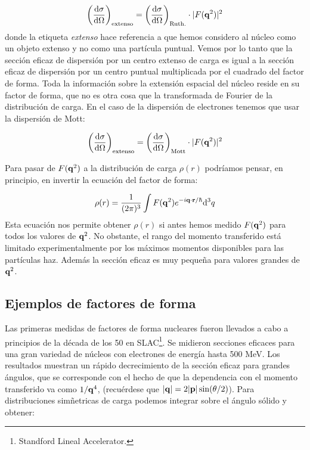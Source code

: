 \begin{equation}
    \left( \frac{\mathrm{d} \sigma}{\mathrm{d} \Omega} \right)_{\text{extenso}} = \left( \frac{\mathrm{d} \sigma}{\mathrm{d} \Omega} \right)_{\text{Ruth.}} \cdot |F(\mathbf{q}^2)|^2
\end{equation} 
donde la etiqueta \textit{extenso} hace referencia a que hemos considero al núcleo como un objeto extenso y no como una partícula puntual. Vemos por lo tanto que la sección eficaz de dispersión por un centro extenso de carga es igual a la sección eficaz de dispersión por un centro puntual multiplicada por el cuadrado del factor de forma. Toda la información sobre la extensión espacial del núcleo reside en su factor de forma, que no es otra cosa que la transformada de Fourier de la distribución de carga. En el caso de la dispersión de electrones tenemos que usar la dispersión de Mott:

\begin{equation}
	\left( \frac{\mathrm{d} \sigma}{\mathrm{d} \Omega} \right)_{\text{extenso}} = \left( \frac{\mathrm{d} \sigma}{\mathrm{d} \Omega} \right)_{\text{Mott}} \cdot |F(\mathbf{q}^2)|^2
\end{equation} 

Para pasar de $F(\mathbf{q}^2)$ a la distribución de carga $\rho(r)$ podríamos pensar, en principio, en invertir la ecuación del factor de forma:

\begin{equation}
    \rho(r)=\frac{1}{(2\pi)^3} \int F(\mathbf{q}^2) e^{-i \mathbf{q} \cdot \mathbf{r}/\hbar} \mathrm{d}^3 q
\end{equation}
Esta ecuación nos permite obtener $\rho(r)$ si antes hemos medido $F(\mathbf{q}^2)$ para todos los valores de $\mathbf{q}^2$. No obstante, el rango del momento transferido está limitado experimentalmente por los máximos momentos disponibles para las partículas haz. Además la sección eficaz es muy pequeña para valores grandes de $\mathbf{q}^2$. 

\subsection{Ejemplos de factores de forma}

Las primeras medidas de factores de forma nucleares fueron llevados a cabo a principios de la década de los 50 en SLAC\footnote{Standford Lineal Accelerator.}. Se midieron secciones eficaces para una gran variedad de núcleos con electrones de energía hasta 500 MeV. Los resultados muestran un rápido decrecimiento de la sección eficaz para grandes ángulos, que se corresponde con el hecho de que la dependencia con el momento transferido va como $1/\mathbf{q}^4$, (recuérdese que $|\mathbf{q}|=2|\mathbf{p}| \sin (\theta /2)$). Para distribuciones simñetricas de carga podemos integrar sobre el ángulo sólido y obtener:

